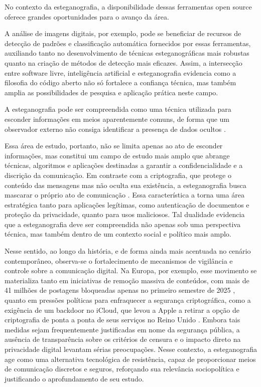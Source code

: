 \documentclass[12pt]{article}
\begin{document}
No contexto da esteganografia, a disponibilidade dessas ferramentas open source
oferece grandes oportunidades para o avanço da área.

A análise de imagens
digitais, por exemplo, pode se beneficiar de recursos de detecção de padrões e
classificação automática fornecidos por essas ferramentas, auxiliando tanto no
desenvolvimento de técnicas esteganográficas mais robustas quanto na criação de
métodos de detecção mais eficazes. Assim, a intersecção entre software livre,
inteligência artificial e esteganografia evidencia como a filosofia do código
aberto não só fortalece a confiança técnica, mas também amplia as
possibilidades de pesquisa e aplicação prática neste campo.

A esteganografia pode ser compreendida como uma técnica utilizada para esconder
informações em meios aparentemente comuns, de forma que um observador externo
não consiga identificar a presença de dados ocultos \cite{Fridrich2010}.

Essa área de estudo, portanto, não se limita apenas ao ato de esconder
informações, mas constitui um campo de estudo mais amplo que abrange técnicas,
algoritmos e aplicações destinadas a garantir a confidencialidade e a discrição
da comunicação. Em contraste com a criptografia, que protege o conteúdo das
mensagens mas não oculta sua existência, a esteganografia busca mascarar o
próprio ato de comunicação \cite{Fridrich2010}. Essa característica a torna uma
área estratégica tanto para aplicações legítimas, como autenticação de
documentos e proteção da privacidade, quanto para usos maliciosos. Tal
dualidade evidencia que a esteganografia deve ser compreendida não apenas sob
uma perspectiva técnica, mas também dentro de um contexto social e político
mais amplo.

Nesse sentido, ao longo da história, e de forma ainda mais acentuada no cenário
contemporâneo, observa-se o fortalecimento de mecanismos de vigilância e
controle sobre a comunicação digital. Na Europa, por exemplo, esse movimento se
materializa tanto em iniciativas de remoção massiva de conteúdos, com mais de
41 milhões de postagens bloqueadas apenas no primeiro semestre de 2025
\cite{poder3602025}, quanto em pressões políticas para enfraquecer a segurança
criptográfica, como a exigência de um backdoor no iCloud, que levou a Apple a
retirar a opção de criptografia de ponta a ponta de seus serviços no Reino
Unido \cite{guardian2025}. Embora tais medidas sejam frequentemente
justificadas em nome da segurança pública, a ausência de transparência sobre os
critérios de censura e o impacto direto na privacidade digital levantam sérias
preocupações. Nesse contexto, a esteganografia age como uma alternativa
tecnológica de resistência, capaz de proporcionar meios de comunicação
discretos e seguros, reforçando sua relevância sociopolítica e justificando o
aprofundamento de seu estudo.
\end{document}
